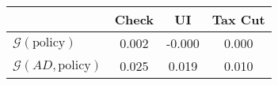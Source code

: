 \begin{tabular}{@{}lccc@{}}
\toprule
                          & Check      & UI    & Tax Cut    \\  \midrule
$\mathcal{G}(\text{policy})$ & 0.002  & -0.000  & 0.000     \\
$\mathcal{G}(AD,\text{policy})$ & 0.025  & 0.019  & 0.010     \\
\end{tabular}
